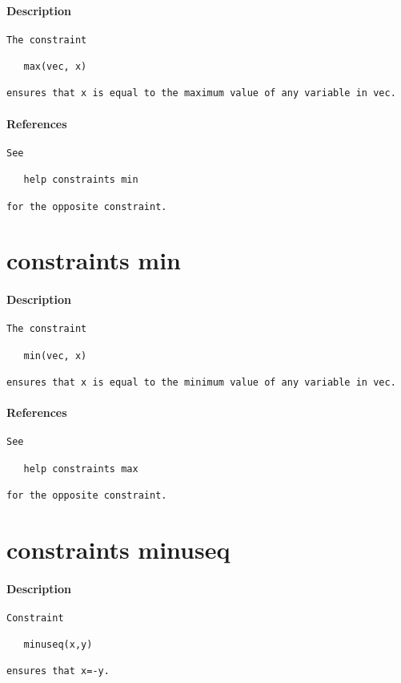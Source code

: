 \paragraph{Description}
{\footnotesize
\begin{verbatim}
The constraint

   max(vec, x)

ensures that x is equal to the maximum value of any variable in vec.
\end{verbatim}
}
\paragraph{References}
{\footnotesize
\begin{verbatim}
See

   help constraints min

for the opposite constraint.
\end{verbatim}
}
\section{constraints min}
\paragraph{Description}
{\footnotesize
\begin{verbatim}
The constraint

   min(vec, x)

ensures that x is equal to the minimum value of any variable in vec.
\end{verbatim}
}
\paragraph{References}
{\footnotesize
\begin{verbatim}
See

   help constraints max

for the opposite constraint.
\end{verbatim}
}
\section{constraints minuseq}
\paragraph{Description}
{\footnotesize
\begin{verbatim}
Constraint

   minuseq(x,y)

ensures that x=-y.
\end{verbatim}
}
